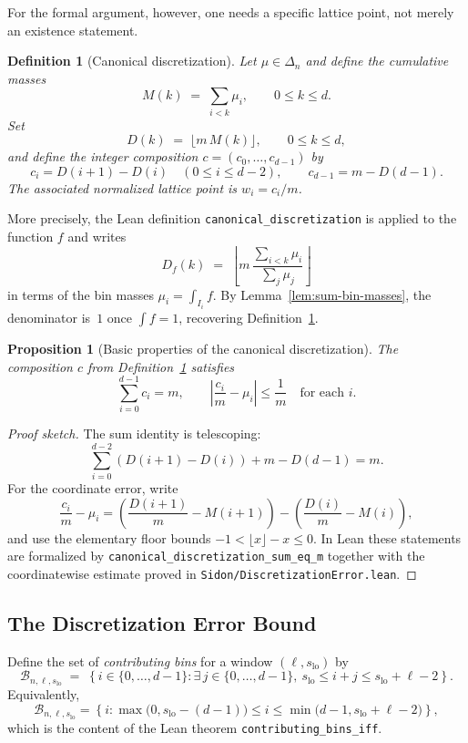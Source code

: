 \documentclass[11pt, letterpaper]{article}
\theoremstyle{paperplain}
\newtheorem{proposition}[theorem]{Proposition}
\theoremstyle{paperdef}
\newtheorem{definition}[theorem]{Definition}
\begin{document}
For the formal argument, however, one needs a specific lattice point,
not merely an existence statement.

\begin{definition}[Canonical discretization]
\label{def:canonical-disc}
Let $\mu\in\Delta_n$ and define the cumulative masses
\[
  M(k) \;=\; \sum_{i<k}\mu_i,
  \qquad 0\le k\le d.
\]
Set
\[
  D(k) \;=\; \lfloor m\,M(k)\rfloor,
  \qquad 0\le k\le d,
\]
and define the integer composition
$c=(c_0,\dots,c_{d-1})$ by
\[
  c_i = D(i+1)-D(i)\quad (0\le i\le d-2),
  \qquad
  c_{d-1}=m-D(d-1).
\]
The associated normalized lattice point is $w_i=c_i/m$.
\end{definition}

More precisely, the Lean definition
\texttt{canonical\_discretization} is applied to the function $f$ and
writes
\[
  D_f(k)
  \;=\;
  \left\lfloor
    m\,
    \frac{\sum_{i<k}\mu_i}{\sum_j \mu_j}
  \right\rfloor
\]
in terms of the bin masses $\mu_i=\int_{I_i}f$.  By
Lemma~\ref{lem:sum-bin-masses}, the denominator is~$1$ once
$\int f=1$, recovering Definition~\ref{def:canonical-disc}.

\begin{proposition}[Basic properties of the canonical discretization]
\label{prop:canonical-disc-basic}
The composition $c$ from Definition~\ref{def:canonical-disc} satisfies
\[
  \sum_{i=0}^{d-1} c_i = m,
  \qquad
  \left| \frac{c_i}{m} - \mu_i \right| \le \frac{1}{m}
  \quad\text{for each } i.
\]
\end{proposition}

\begin{proof}[Proof sketch]
The sum identity is telescoping:
\[
  \sum_{i=0}^{d-2} (D(i+1)-D(i)) + m-D(d-1) = m.
\]
For the coordinate error, write
\[
  \frac{c_i}{m}-\mu_i
  =
  \left(\frac{D(i+1)}{m}-M(i+1)\right)
  -
  \left(\frac{D(i)}{m}-M(i)\right),
\]
and use the elementary floor bounds
$-1<\lfloor x\rfloor-x\le 0$.  In Lean these statements are formalized
by \texttt{canonical\_discretization\_sum\_eq\_m} together with the
coordinatewise estimate proved in
\texttt{Sidon/DiscretizationError.lean}.
\end{proof}

\subsection{The Discretization Error Bound}

Define the set of \emph{contributing bins} for a window
$(\ell,s_{\mathrm{lo}})$ by
\[
  \mathcal{B}_{n,\ell,s_{\mathrm{lo}}}
  \;=\;
  \left\{
    i\in\{0,\dots,d-1\} :
    \exists\, j\in\{0,\dots,d-1\},\
    s_{\mathrm{lo}}\le i+j\le s_{\mathrm{lo}}+\ell-2
  \right\}.
\]
Equivalently,
\[
  \mathcal{B}_{n,\ell,s_{\mathrm{lo}}}
  =
  \left\{
    i :
    \max\!\bigl(0,s_{\mathrm{lo}}-(d-1)\bigr)
    \le i \le
    \min\!\bigl(d-1,s_{\mathrm{lo}}+\ell-2\bigr)
  \right\},
\]
which is the content of the Lean theorem
\texttt{contributing\_bins\_iff}.
\end{document}
